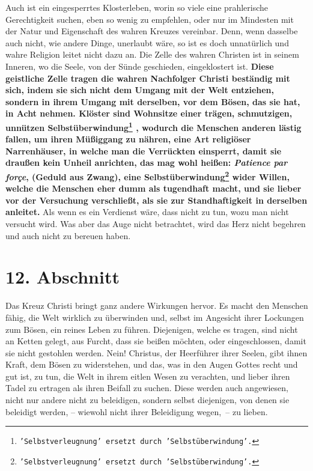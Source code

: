 Auch ist ein eingesperrtes Klosterleben, worin so viele eine
prahlerische
Gerechtigkeit suchen, eben so wenig zu empfehlen, oder nur im Mindesten mit der
Natur und Eigenschaft des wahren Kreuzes vereinbar. Denn, wenn dasselbe auch
nicht, wie andere Dinge, unerlaubt wäre, so ist es doch unnatürlich und wahre
Religion leitet nicht dazu an. Die Zelle des wahren Christen ist in seinem
Inneren, wo die Seele, von der Sünde geschieden, eingeklostert ist.
\label{ref:05_11_kloster} \textbf{Diese
geistliche Zelle tragen die wahren Nachfolger Christi beständig mit sich, indem
sie sich nicht dem Umgang mit der Welt entziehen, sondern in ihrem Umgang mit
derselben, vor dem Bösen, das sie hat, in Acht nehmen. Klöster sind Wohnsitze
einer trägen, schmutzigen, unnützen
Selbstüberwindung\footnote{\texttt{'Selbstverleugnung' ersetzt durch
'Selbstüberwindung'.}}
, wodurch die Menschen
anderen lästig fallen, um ihren Müßiggang zu nähren, eine
Art religiöser Narrenhäuser, in welche man die
Verrückten einsperrt, damit sie draußen kein
Unheil anrichten, das mag wohl heißen: \textit{Patience par forçe}, (Geduld aus
Zwang), eine Selbstüberwindung\footnote{\texttt{'Selbstverleugnung' ersetzt durch
'Selbstüberwindung'.}} wider Willen, welche die Menschen eher dumm als
tugendhaft macht, und sie lieber vor der Versuchung verschließt, als sie zur
Standhaftigkeit in derselben anleitet.} Als wenn es ein Verdienst wäre, dass
nicht
zu tun, wozu man nicht versucht wird. Was aber das Auge nicht betrachtet, wird
das Herz nicht begehren und auch nicht zu bereuen haben.

\section{12. Abschnitt} \label{kap5_ab12}

Das Kreuz Christi bringt ganz andere Wirkungen hervor. Es macht den Menschen
fähig, die Welt wirklich zu überwinden und, selbst im Angesicht ihrer Lockungen
zum Bösen, ein reines Leben zu führen. Diejenigen, welche es tragen, sind nicht
an Ketten gelegt, aus Furcht, dass sie beißen möchten, oder eingeschlossen,
damit
sie nicht gestohlen werden. Nein! Christus, der Heerführer ihrer Seelen, gibt
ihnen Kraft, dem Bösen zu widerstehen, und das, was in den Augen Gottes recht
und gut ist, zu tun, die Welt in ihrem eitlen Wesen zu verachten, und lieber
ihren Tadel zu ertragen als ihren Beifall zu suchen. Diese
werden auch
angewiesen, nicht nur andere nicht zu beleidigen, sondern selbst diejenigen, von
denen sie beleidigt werden, -- wiewohl nicht ihrer Beleidigung wegen,~-- zu
lieben.

